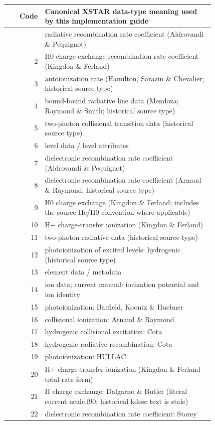 \documentclass[
  10pt,
]{article}
\begin{document}
\begin{longtable}[]{@{}r p{0.82\linewidth}@{}}
\toprule\noalign{}
Code & Canonical XSTAR data-type meaning used by this implementation guide \\
\midrule\noalign{}
\endhead
\bottomrule\noalign{}
\endlastfoot
1 & radiative recombination rate coefficient (Aldrovandi \& Pequignot) \\
2 & H0 charge-exchange recombination rate coefficient (Kingdon \& Ferland) \\
3 & autoionization rate (Hamilton, Sarazin \& Chevalier; historical source type) \\
4 & bound-bound radiative line data (Mendoza; Raymond \& Smith; historical source type) \\
5 & two-photon collisional transition data (historical source type) \\
6 & level data / level attributes \\
7 & dielectronic recombination rate coefficient (Aldrovandi \& Pequignot) \\
8 & dielectronic recombination rate coefficient (Arnaud \& Raymond; historical source type) \\
9 & H0 charge exchange (Kingdon \& Ferland; includes the source He/H0 convention where applicable) \\
10 & H+ charge-transfer ionization (Kingdon \& Ferland) \\
11 & two-photon radiative data (historical source type) \\
12 & photoionization of excited levels: hydrogenic (historical source type) \\
13 & element data / metadata \\
14 & ion data; current manual: ionization potential and ion identity \\
15 & photoionization: Barfield, Koontz \& Huebner \\
16 & collisional ionization: Arnaud \& Raymond \\
17 & hydrogenic collisional excitation: Cota \\
18 & hydrogenic radiative recombination: Cota \\
19 & photoionization: HULLAC \\
20 & H+ charge-transfer ionization (Kingdon \& Ferland total-rate form) \\
21 & H charge exchange: Dalgarno \& Butler (literal current ucalc.f90; historical kdesc text is stale) \\
22 & dielectronic recombination rate coefficient: Storey \\

\end{longtable}
\end{document}
